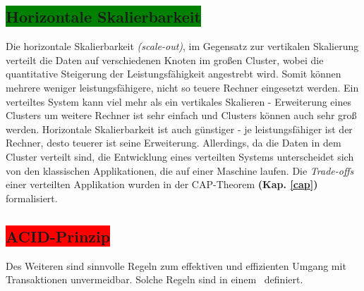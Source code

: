 \subsection{\colorbox{green}{Horizontale Skalierbarkeit}}

Die horizontale Skalierbarkeit \textit{(scale-out)}, im Gegensatz zur vertikalen Skalierung verteilt die Daten auf verschiedenen Knoten im großen Cluster, wobei die quantitative Steigerung der Leistungsfähigkeit angestrebt wird. Somit können mehrere weniger leistungsfähigere, nicht so teuere Rechner eingesetzt werden. %
Ein verteiltes System kann viel mehr als ein vertikales Skalieren - Erweiterung eines Clusters um weitere Rechner ist sehr einfach und Clusters können auch sehr groß werden.  Horizontale Skalierbarkeit ist auch günstiger - je leistungsfähiger ist der Rechner, desto teuerer ist seine Erweiterung. Allerdings, da die Daten in dem Cluster verteilt sind, die Entwicklung eines verteilten Systems unterscheidet sich von den klassischen Applikationen, die auf einer Maschine laufen. Die \textit{Trade-offs} einer verteilten Applikation wurden in der CAP-Theorem \textbf{(Kap. \ref{cap})}  formalisiert.

\subsection{\colorbox{red}{ACID-Prinzip}}\label{acid}

Des Weiteren sind sinnvolle Regeln zum effektiven und effizienten Umgang mit Transaktionen unvermeidbar. Solche Regeln sind in einem \acid\ definiert.

